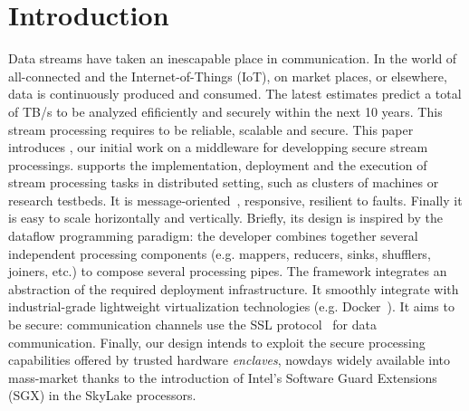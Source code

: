 \section{Introduction}
\label{sec:introduction}


Data streams have taken an inescapable place in communication.
In the world of all-connected and the Internet-of-Things (IoT), on market places, or elsewhere, data is continuously produced and consumed.
The latest estimates predict a total of  TB/s to be analyzed efificiently and securely within the next 10 years.
This stream processing requires to be reliable, scalable and secure.
This paper introduces \SYS, our initial work on a middleware for developping secure stream processings.
\SYS supports the implementation, deployment and the execution of stream processing tasks in distributed setting, such as clusters of machines or research testbeds.
It is message-oriented~\cite{mom}, responsive, resilient to faults.
Finally it is easy to scale horizontally and vertically.
Briefly, its design is inspired by the dataflow programming paradigm\cite{uustalu_essence_2005}: the developer combines together several independent processing components (e.g. mappers, reducers, sinks, shufflers, joiners, etc.) to compose several processing pipes.%
The framework integrates an abstraction of the required deployment infrastructure.
It smoothly integrate with industrial-grade lightweight virtualization technologies (e.g. Docker~\cite{docker}).%
It aims to be secure: communication channels use the SSL protocol~\cite{freier2011secure} for data communication.
Finally, our design intends to exploit the secure processing capabilities offered by trusted hardware \emph{enclaves}, nowdays widely available into mass-market thanks to the introduction of Intel's Software Guard Extensions (SGX)\cite{costan_intel} in the SkyLake processors\cite{skylake}.

